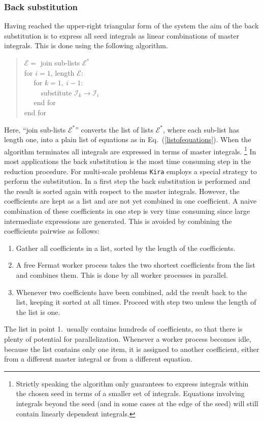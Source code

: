 \documentclass[a4paper,12pt]{scrartcl}
\newcommand*{\kira}{\texttt{Kira}}
\newcommand*{\CE}{\mathcal{E}}
\newcommand*{\CI}{\mathcal{I}}
\def\Eq#1{{Eq.~(\ref{#1})}}
\begin{document}
\subsubsection{Back substitution}
\label{back-substitution}
Having reached the upper-right triangular form of the system the aim
of the back substitution is to express all
seed integrals as linear combinations of master integrals. This
is done using the following algorithm.
\begin{verse}
  $\CE =$ join sub-lists $\CE^*$\\
  for $i=1$, length $\CE$:\\
  $\quad$ for $k=1,~i-1$:\\
  $\quad\quad$ substitute $\CI_k\to\CI_i$\\
  $\quad$ end for\\
  end for
\end{verse}
Here, ``join sub-lists $\CE^*$'' converts the list of lists $\CE^*$, where each
sub-list has length one, into a plain list of equations as in
\Eq{listofequations}. When the algorithm terminates all integrals are expressed
in terms of master integrals.%
\footnote{
  Strictly speaking the algorithm only guarantees to express integrals within
  the chosen seed in terms of a smaller set of integrals. Equations involving
  integrals beyond the seed (and in some cases at the edge of the seed) will
  still contain linearly dependent integrals.
}
In most applications the back substitution is the most time consuming step in
the reduction procedure.  For multi-scale problems \kira{} employs a special
strategy to perform the substitution. In a first step the back substitution is
performed and the result is sorted again with respect to the master integrals.
However, the coefficients are kept as a list and are not yet combined in one
coefficient. A naive combination of these coefficients in one step is very time
consuming since large intermediate expressions are generated. This is
avoided by combining the coefficients pairwise as follows:
\begin{enumerate}
  \item Gather all coefficients in a list, sorted by the length of the
        coefficients.
  \item A free Fermat worker process takes the two shortest coefficients from
        the list and combines them. This is done by all worker processes
        in parallel.
  \item Whenever two coefficients have been combined, add the result back to the
        list, keeping it sorted at all times. Proceed with step two unless the
        length of the list is one.
\end{enumerate}
The list in point 1.\ usually contains hundreds of coefficients, so that there
is plenty of potential for parallelization. Whenever a worker process becomes
idle, because the list contains only one item, it is assigned to another
coefficient, either from a different master integral or from a different
equation.
\end{document}
